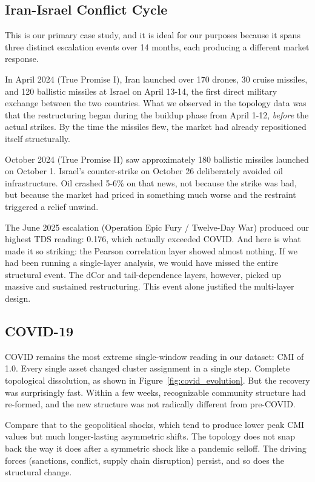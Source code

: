 \documentclass[12pt, letterpaper]{article}
\begin{document}
\subsection{Iran-Israel Conflict Cycle}

This is our primary case study, and it is ideal for our purposes because it spans three distinct escalation events over 14 months, each producing a different market response.

In April 2024 (True Promise I), Iran launched over 170 drones, 30 cruise missiles, and 120 ballistic missiles at Israel on April 13-14, the first direct military exchange between the two countries. What we observed in the topology data was that the restructuring began during the buildup phase from April 1-12, \textit{before} the actual strikes. By the time the missiles flew, the market had already repositioned itself structurally.

October 2024 (True Promise II) saw approximately 180 ballistic missiles launched on October 1. Israel's counter-strike on October 26 deliberately avoided oil infrastructure. Oil crashed 5-6\% on that news, not because the strike was bad, but because the market had priced in something much worse and the restraint triggered a relief unwind.

The June 2025 escalation (Operation Epic Fury / Twelve-Day War) produced our highest TDS reading: 0.176, which actually exceeded COVID. And here is what made it so striking: the Pearson correlation layer showed almost nothing. If we had been running a single-layer analysis, we would have missed the entire structural event. The dCor and tail-dependence layers, however, picked up massive and sustained restructuring. This event alone justified the multi-layer design.

\subsection{COVID-19}

COVID remains the most extreme single-window reading in our dataset: CMI of 1.0. Every single asset changed cluster assignment in a single step. Complete topological dissolution, as shown in Figure~\ref{fig:covid_evolution}. But the recovery was surprisingly fast. Within a few weeks, recognizable community structure had re-formed, and the new structure was not radically different from pre-COVID.

Compare that to the geopolitical shocks, which tend to produce lower peak CMI values but much longer-lasting asymmetric shifts. The topology does not snap back the way it does after a symmetric shock like a pandemic selloff. The driving forces (sanctions, conflict, supply chain disruption) persist, and so does the structural change.
\end{document}
